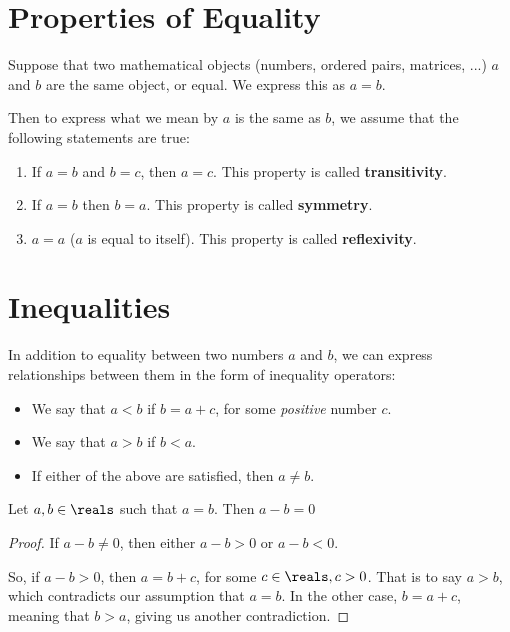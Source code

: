 \section{Properties of Equality}
Suppose that two mathematical objects (numbers, ordered pairs, matrices,
...) $a$ and $b$ are the same object, or equal. We express this as $a = b$.

Then to express what we mean by $a$ is the same as $b$, we assume that the
following statements are true:
\begin{enumerate}[label=(\alph*)]
  \item If $a = b$ and $b = c$, then $a = c$. This property is called
  \textbf{transitivity}.
  \item If $a = b$ then $b = a$. This property is called \textbf{symmetry}.
  \item $a = a$ ($a$ is equal to itself). This property is called
  \textbf{reflexivity}.
\end{enumerate}

\section{Inequalities}
In addition to equality between two numbers $a$ and $b$, we can express
relationships between them in the form of inequality operators:

\begin{itemize}
  \item We say that $a < b$ if $b = a + c$, for some \emph{positive}
  number $c$.
  \item We say that $a > b$ if $b < a$.
  \item If either of the above are satisfied, then $a \neq b$.
\end{itemize}


\begin{theorem}
  Let $a, b \in \reals$ such that $a = b$. Then $a - b = 0$
\end{theorem}
\begin{proof}
  If $a - b \neq 0$, then either $a - b > 0$ or $a - b < 0$.

  So, if $a - b > 0$, then $a = b + c$, for some $c \in \reals, c > 0$. That is
  to say $a > b$, which contradicts our assumption that $a = b$. In the other
  case, $b = a + c$, meaning that $b > a$, giving us another contradiction.
\end{proof}
